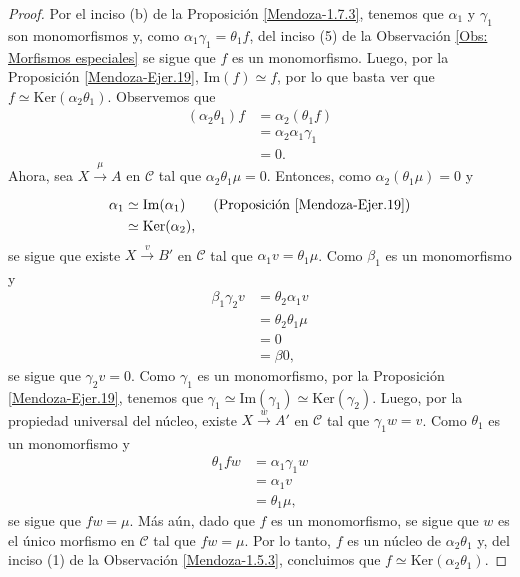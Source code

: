 \documentclass[tesis]{subfiles}
\begin{document}
\begin{proof}
    Por el inciso (b) de la Proposición \ref{Mendoza-1.7.3}, tenemos que $\alpha_1$ y $\gamma_1$ son monomorfismos y, como $\alpha_1\gamma_1 = \theta_1 f$, del inciso (5) de la Observación \ref{Obs: Morfismos especiales} se sigue que $f$ es un monomorfismo. Luego, por la Proposición \ref{Mendoza-Ejer.19}, $\text{Im}(f)\simeq f$, por lo que basta ver que $f\simeq \text{Ker}(\alpha_2\theta_1)$. Observemos que
    \begin{align*}
        (\alpha_2\theta_1)f &= \alpha_2(\theta_1 f) \\
                            &= \alpha_2\alpha_1\gamma_1 \\
                            &= 0.
    \end{align*}
    Ahora, sea $X\xrightarrow[]{\mu} A$ en $\mathscr{C}$ tal que $\alpha_2\theta_1\mu=0$. Entonces, como $\alpha_2(\theta_1\mu) = 0$ y
    \begin{align*}
        \alpha_1 &\simeq \text{Im}(\alpha_1) \tag{Proposición \ref{Mendoza-Ejer.19}} \\
                 &\simeq \text{Ker}(\alpha_2),
    \end{align*}
    se sigue que existe $X\xrightarrow[]{v} B'$ en $\mathscr{C}$ tal que $\alpha_1v = \theta_1\mu$. Como $\beta_1$ es un monomorfismo y
    \begin{align*}
        \beta_1\gamma_2 v &= \theta_2\alpha_1 v \\
                          &= \theta_2\theta_1\mu \\
                          &= 0 \\
                          &= \beta0,
    \end{align*}
    se sigue que $\gamma_2 v = 0$. Como $\gamma_1$ es un monomorfismo, por la Proposición \ref{Mendoza-Ejer.19}, tenemos que $\gamma_1\simeq\text{Im}(\gamma_1)\simeq\text{Ker}(\gamma_2)$. Luego, por la propiedad universal del núcleo, existe $X\xrightarrow[]{w}A'$ en $\mathscr{C}$ tal que $\gamma_1 w=v$. Como $\theta_1$ es un monomorfismo y
    \begin{align*}
        \theta_1 fw &= \alpha_1\gamma_1 w \\
                    &= \alpha_1 v \\
                    &= \theta_1\mu,
    \end{align*}
    se sigue que $fw=\mu$. Más aún, dado que $f$ es un monomorfismo, se sigue que $w$ es el único morfismo en $\mathscr{C}$ tal que $fw=\mu$. Por lo tanto, $f$ es un núcleo de $\alpha_2\theta_1$ y, del inciso (1) de la Observación \ref{Mendoza-1.5.3}, concluimos que $f\simeq\text{Ker}(\alpha_2\theta_1)$.
\end{proof}
\end{document}

